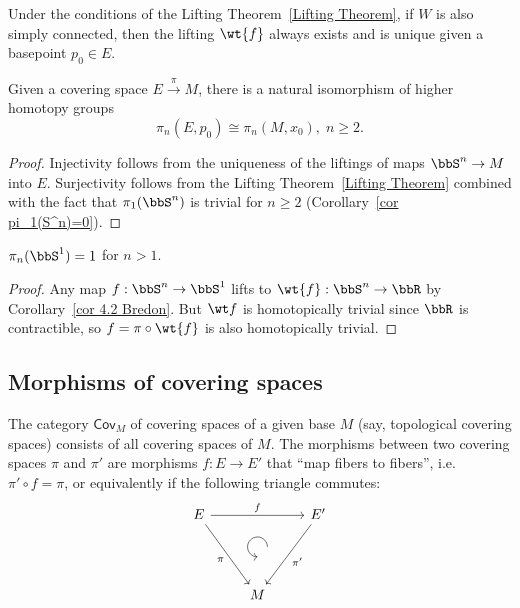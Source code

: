 \begin{cor}\label{cor 4.2 Bredon}
    Under the conditions of the Lifting Theorem~\ref{Lifting Theorem}, if $W$ is also simply connected, then the lifting $\wt{f}$ always exists and is unique given a basepoint $p_0\in E$.
\end{cor}

\begin{cor}\label{cor homotopy groups of coverings}
    Given a covering space $E\overset{\pi}{\to}M$, there is a natural isomorphism of higher homotopy groups
    \[\pi_n(E,p_0)\cong \pi_n(M,x_0),\; n\geq 2.\]
\end{cor}
\begin{proof}
    Injectivity follows from the uniqueness of the liftings of maps $\bbS^n\to M$ into $E$. Surjectivity follows from the Lifting Theorem~\ref{Lifting Theorem} combined with the fact that $\pi_1(\bbS^n)$ is trivial for $n\geq 2$ (Corollary~\ref{cor pi_1(S^n)=0}).
\end{proof}

\begin{cor}\label{cor: homotopy groups of circle}
    $\pi_n(\bbS^1)=1$ for $n>1$.
\end{cor}
\begin{proof}
    Any map $f:\bbS^n\to \bbS^1$ lifts to $\wt{f}:\bbS^n\to \bbR $ by Corollary~\ref{cor 4.2 Bredon}. But $\wt f$ is homotopically trivial since $\bbR $ is contractible, so $f=\pi\circ\wt{f}$ is also homotopically trivial.
\end{proof}


\subsection{Morphisms of covering spaces}


\begin{defn}
The category $\mathsf{Cov}_M$ of covering spaces of a given base $M$ (say, topological covering spaces) consists of all covering spaces of $M$. The morphisms between two covering spaces $\pi$ and $\pi'$ are morphisms $f:E\to E'$ that ``map fibers to fibers'', i.e.\ $\pi'\circ f=\pi$, or equivalently if the following triangle commutes:
\[
\begin{tikzcd}[every matrix/.append style={name=m},   
execute at end picture={\draw [<-] ([xshift=0mm,yshift=-2mm]m-2-2.north) arc[start angle=-90,delta angle=-270,radius=0.25cm];}]
   E \arrow[rr,"f"]\arrow[ddr,swap,"\pi"]& & E'\arrow[ddl,"\pi'"]\\
   & \, & \\
   & M & \\
\end{tikzcd}
\]
\end{defn}


